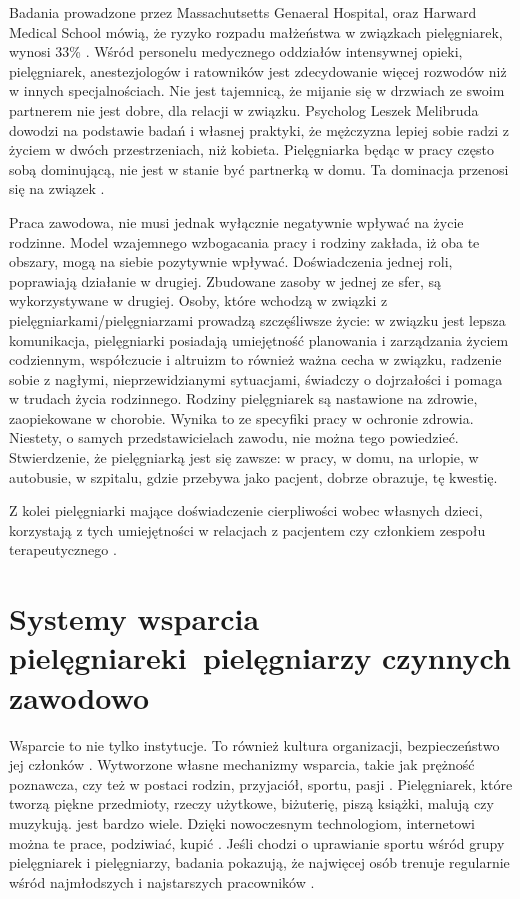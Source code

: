 \documentclass[a4paper,12pt,twoside,openany]{report}
\begin{document}
Badania prowadzone przez Massachutsetts Genaeral Hospital, oraz Harward Medical School mówią, że ryzyko rozpadu małżeństwa w związkach pielęgniarek, wynosi 33\% \cite{rozwody}.  Wśród personelu medycznego oddziałów intensywnej opieki, pielęgniarek, anestezjologów i ratowników jest zdecydowanie więcej rozwodów niż w innych specjalnościach.  Nie jest tajemnicą, że mijanie się w drzwiach ze swoim partnerem nie jest dobre, dla relacji w związku. Psycholog Leszek Melibruda dowodzi na podstawie badań i własnej praktyki, że mężczyzna lepiej sobie radzi z życiem w dwóch przestrzeniach, niż kobieta. Pielęgniarka będąc w pracy często sobą dominującą, nie jest w stanie być partnerką w domu. Ta dominacja przenosi się na związek \cite{melibruda}.

Praca zawodowa, nie musi jednak wyłącznie negatywnie wpływać na życie rodzinne. Model wzajemnego wzbogacania pracy i rodziny zakłada, iż oba te obszary, mogą na siebie pozytywnie wpływać. Doświadczenia jednej roli, poprawiają działanie w drugiej. Zbudowane zasoby w jednej ze sfer, są wykorzystywane w drugiej.  Osoby, które wchodzą w związki z pielęgniarkami/pielęgniarzami prowadzą szczęśliwsze życie: w związku jest lepsza komunikacja, pielęgniarki posiadają umiejętność planowania i zarządzania życiem codziennym, współczucie i altruizm to również ważna cecha w związku, radzenie sobie z nagłymi, nieprzewidzianymi sytuacjami, świadczy o dojrzałości i pomaga w trudach życia rodzinnego. Rodziny pielęgniarek są nastawione na zdrowie, zaopiekowane w chorobie. Wynika to ze specyfiki pracy w ochronie zdrowia. Niestety, o samych przedstawicielach zawodu, nie można tego powiedzieć. Stwierdzenie, że pielęgniarką jest się zawsze: w pracy, w domu, na urlopie, w autobusie, w szpitalu, gdzie przebywa jako pacjent, dobrze obrazuje, tę kwestię.

Z kolei pielęgniarki mające doświadczenie cierpliwości wobec własnych dzieci, korzystają z tych umiejętności w relacjach z pacjentem czy członkiem zespołu terapeutycznego \cite{wzbogacanie}.

\section{Systemy wsparcia pielęgniarek\newline i~pielęgniarzy czynnych zawodowo}
\label{sectionSystemyWsparcia}
Wsparcie to nie tylko instytucje. To również kultura organizacji, bezpieczeństwo jej członków \cite{bezpieczeństwo}. Wytworzone własne mechanizmy wsparcia, takie jak  prężność poznawcza, czy też w postaci  rodzin, przyjaciół, sportu, pasji \cite{prężność}. Pielęgniarek, które tworzą piękne przedmioty, rzeczy użytkowe, biżuterię, piszą książki, malują czy muzykują. jest bardzo wiele. Dzięki nowoczesnym technologiom, internetowi można te prace, podziwiać, kupić \cite{talent}. Jeśli chodzi o uprawianie sportu wśród grupy pielęgniarek i pielęgniarzy, badania pokazują, że najwięcej osób trenuje regularnie wśród najmłodszych i najstarszych pracowników \cite{sport}.
\end{document}
